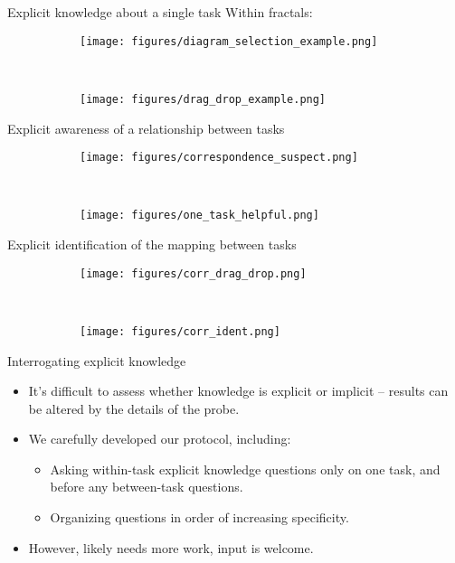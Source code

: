 \documentclass{beamer}
\begin{document}

\begin{frame}{Explicit knowledge about a single task}
Within fractals:
\begin{figure}
\centering
\begin{subfigure}{0.45\textwidth}
\texttt{[image: figures/diagram\_selection\_example.png]}
\end{subfigure}~
\begin{subfigure}{0.45\textwidth}
\texttt{[image: figures/drag\_drop\_example.png]}
\end{subfigure}
\end{figure}
\end{frame}

\begin{frame}{Explicit awareness of a relationship between tasks}
\begin{figure}
\centering
\begin{subfigure}{0.9\textwidth}
\texttt{[image: figures/correspondence\_suspect.png]}
\end{subfigure}\\
\begin{subfigure}{0.9\textwidth}
\texttt{[image: figures/one\_task\_helpful.png]}
\end{subfigure}
\end{figure}
\end{frame}

\begin{frame}{Explicit identification of the mapping between tasks}
\begin{figure}
\centering
\begin{subfigure}{0.45\textwidth}
\texttt{[image: figures/corr\_drag\_drop.png]}
\end{subfigure}~
\begin{subfigure}{0.45\textwidth}
\texttt{[image: figures/corr\_ident.png]}
\end{subfigure}
\end{figure}
\end{frame}

\begin{frame}{Interrogating explicit knowledge}
\begin{itemize}
\item It's difficult to assess whether knowledge is explicit or implicit \citep{Newell2014} -- results can be altered by the details of the probe. 
\item<2-> We carefully developed our protocol, including: 
\begin{itemize}
\item<3-> Asking within-task explicit knowledge questions only on one task, and before any between-task questions.
\item<4-> Organizing questions in order of increasing specificity. 
\end{itemize}
\item <5-> However, likely needs more work, input is welcome.
\end{itemize}
\end{frame}
\end{document}
